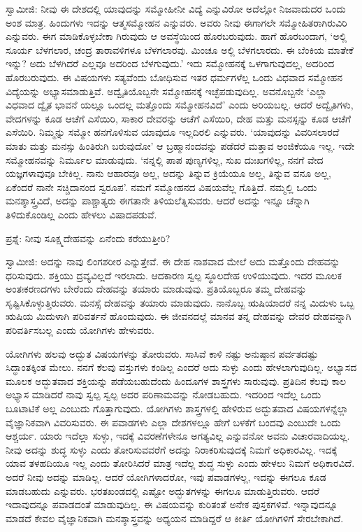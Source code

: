 ಸ್ವಾಮೀಜಿ: ನೀವು ಈ ದೇಶದಲ್ಲಿ ಯಾವುದನ್ನು ಸಮ್ಮೋಹೀನೀ ವಿದ್ಯೆ  ಎನ್ನುವಿರೋ ಅದೆಲ್ಲೋ ನಿಜವಾದುದರ ಒಂದು ಅಂಶ ಮಾತ್ರ. ಹಿಂದುಗಳು ಇದನ್ನು ಆತ್ಮಸಮ್ಮೋಹನ  ಎನ್ನುವರು. ಅವರು ನೀವು ಈಗಾಗಲೇ ಸಮ್ಮೋಹಿತರಾಗಿರುವಿರಿ ಎನ್ನುವರು. ಈಗ ಮಾಡಿಕೊಳ್ಳಬೇಕಾ ಗಿರುವುದು ಆ ಅವಸ್ಥೆಯಿಂದ ಹೊರಬರುವುದು. ಹಾಗೆ ಹೊರಬಂದಾಗ, ‘ಅಲ್ಲಿ ಸೂರ್ಯ ಬೆಳಗಲಾರ, ಚಂದ್ರ ತಾರಾವಳಿಗಳೂ ಬೆಳಗಲಾರವು. ಮಿಂಚೂ ಅಲ್ಲಿ ಬೆಳಗಲಾರದು. ಈ ಬೆಂಕಿಯ ಮಾತೇಕೆ ಇನ್ನು? ಅದು ಬೆಳಗಿದರೆ ಎಲ್ಲವೂ ಅದರಿಂದ ಬೆಳಗುವುದು.’ ಇದು ಸಮ್ಮೋಹನಕ್ಕೆ ಒಳಗಾಗುವುದಲ್ಲ, ಅದರಿಂದ ಹೊರಬರುವುದು. ಈ ವಿಷಯಗಳು ಸತ್ಯವೆಂದು ಬೋಧಿಸುವ ಇತರ ಧರ್ಮಗಳೆಲ್ಲ ಒಂದು ವಿಧವಾದ ಸಮ್ಮೋಹನ ವಿದ್ಯೆಯನ್ನು ಅಭ್ಯಾಸಮಾಡುತ್ತಿವೆ. ಅದ್ವೈತಿಯೊಬ್ಬನೇ ಸಮ್ಮೋಹನಕ್ಕೆ ಇಚ್ಛೆಪಡುವುದಿಲ್ಲ. ಅವನೊಬ್ಬನೇ ‘ಎಲ್ಲಾ ವಿಧವಾದ ದ್ವೈತ ಭಾವನೆ ಯಲ್ಲೂ ಒಂದಲ್ಲ ಮತ್ತೊಂದು ಸಮ್ಮೋಹನವಿದೆ’ ಎಂದು ಅರಿಯಬಲ್ಲ. ಆದರೆ ಅದ್ವೈತಿಗಳು, ವೇದಗಳನ್ನು ಕೂಡ ಆಚೆಗೆ ಎಸೆಯಿರಿ, ಸಾಕಾರ ದೇವರನ್ನು ಆಚೆಗೆ ಎಸೆಯಿರಿ, ದೇಹ ಮತ್ತು ಮನಸ್ಸನ್ನು ಕೂಡ ಆಚೆಗೆ ಎಸೆಯಿರಿ. ನಿಮ್ಮನ್ನು ಸಮ್ಮೋ ಹನಗೊಳಿಸುವ ಯಾವುದೂ ಇಲ್ಲದಿರಲಿ ಎನ್ನುವರು. ‘ಯಾವುದನ್ನು ವಿವರಿಸಲಾರದೆ ಮಾತು ಮತ್ತು ಮನಸ್ಸು ಹಿಂತಿರುಗಿ ಬರುವುದೋ’ ಆ ಬ್ರಹ್ಮಾನಂದವನ್ನು ಪಡೆದರೆ ಮತ್ತಾವ ಅಂಜಿಕೆಯೂ ಇಲ್ಲ. ಇದೇ ಸಮ್ಮೋಹನವನ್ನು ನಿರ್ಮೂಲ ಮಾಡುವುದು. ‘ನನ್ನಲ್ಲಿ ಪಾಪ ಪುಣ್ಯಗಳಿಲ್ಲ, ಸುಖ ದುಃಖಗಳಿಲ್ಲ, ನನಗೆ ವೇದ ಯಜ್ಞಗಳಾವುವೂ ಬೇಕಿಲ್ಲ. ನಾನು ಆಹಾರವೂ ಅಲ್ಲ, ಅದನ್ನು ತಿನ್ನುವ ಕ್ರಿಯೆಯೂ ಅಲ್ಲ, ತಿನ್ನುವ ವನೂ ಅಲ್ಲ, ಏಕೆಂದರೆ ನಾನೇ ಸಚ್ಚಿದಾನಂದ ಸ್ವರೂಪ’. ನಮಗೆ ಸಮ್ಮೋಹನದ ವಿಷಯವೆಲ್ಲ ಗೊತ್ತಿದೆ. ನಮ್ಮಲ್ಲಿ ಒಂದು ಮನಶ್ಶಾಸ್ತ್ರವಿದೆ, ಅದನ್ನು ಪಾಶ್ಚಾತ್ಯರು ಈಗತಾನೇ ತಿಳಿಯಲೆತ್ನಿಸುವರು. ಆದರೆ ಅದನ್ನು ಇನ್ನೂ ಚೆನ್ನಾಗಿ ತಿಳಿದುಕೊಂಡಿಲ್ಲ ಎಂದು ಹೇಳಲು ವಿಷಾದಪಡುವೆ.

ಪ್ರಶ್ನೆ: ನೀವು ಸೂಕ್ಷ್ಮದೇಹವನ್ನು ಏನೆಂದು ಕರೆಯುತ್ತೀರಿ?

ಸ್ವಾಮೀಜಿ: ಅದನ್ನು ನಾವು ಲಿಂಗಶರೀರ ಎನ್ನುತ್ತೇವೆ. ಈ ದೇಹ ನಾಶವಾದ ಮೇಲೆ ಅದು ಮತ್ತೊಂದು ದೇಹವನ್ನು ಧರಿಸುವುದು. ಶಕ್ತಿಯು ದ್ರವ್ಯವಿಲ್ಲದೆ ಇರಲಾದು. ಆದಕಾರಣ ಸ್ವಲ್ಪ ಸ್ಥೂಲದೇಹ ಉಳಿಯುವುದು. ಇದರ ಮೂಲಕ ಅಂತಃಕರಣದಗಳು ಬೇರೆಂದು ದೇಹವನ್ನು ತಯಾರು ಮಾಡುವುವು. ಪ್ರತಿಯೊಬ್ಬರೂ ತಮ್ಮ ದೇಹವನ್ನು ಸೃಷ್ಟಿಸಿಕೊಳ್ಳುತ್ತಿರುವರು. ಮನಸ್ಸೆ ದೇಹವನ್ನು ತಯಾರು ಮಾಡುವುದು. ನಾನೊಬ್ಬ ಋಷಿಯಾದರೆ ನನ್ನ ಮಿದುಳು ಒಬ್ಬ ಋಷಿಯ ಮಿದುಳಾಗಿ ಪರಿವರ್ತನೆ ಹೊಂದುವುದು. ಈ ಜೀವನದಲ್ಲೆ ಮಾನವ ತನ್ನ ದೇಹವನ್ನು ದೇವರ ದೇಹವನ್ನಾಗಿ ಪರಿವರ್ತಿಸಬಲ್ಲ ಎಂದು ಯೋಗಿಗಳು ಹೇಳುವರು.

ಯೋಗಿಗಳು ಹಲವು ಅದ್ಭುತ ವಿಷಯಗಳನ್ನು ತೋರುವರು. ಸಾಸಿವೆ ಕಾಳಿ ನಷ್ಟು ಅನುಷ್ಠಾನ ಪರ್ವತದಷ್ಟು ಸಿದ್ಧಾಂತಕ್ಕಿಂತ ಮೇಲು. ನನಗೆ ಕೆಲವು ವಸ್ತುಗಳು ಕಂಡಿಲ್ಲ ಎಂದರೆ ಅದು ಸುಳ್ಳು ಎಂದು ಹೇಳಲಾಗುವುದಿಲ್ಲ. ಅಭ್ಯಾಸದ ಮೂಲಕ ಅದ್ಭುತವಾದ ಶಕ್ತಿಯನ್ನು ಪಡೆಯಬಹುದೆಂದು ಹಿಂದೂಗಳ ಶಾಸ್ತ್ರಗಳು ಸಾರುವುವು. ಪ್ರತಿದಿನ ಕೆಲವು ಕಾಲ ಅಭ್ಯಾಸ ಮಾಡಿದರೆ ನಾವು ಸ್ವಲ್ಪ ಸ್ವಲ್ಪ ಅದರ ಪರಿಣಾಮವನ್ನು ನೋಡಬಹುದು. ಇದರಿಂದ ಇದೆಲ್ಲ ಒಂದು ಬೂಟಾಟಿಕೆ ಅಲ್ಲ ಎಂಬುದು ಗೊತ್ತಾಗುವುದು. ಯೋಗಿಗಳು ಶಾಸ್ತ್ರಗಳಲ್ಲಿ ಹೇಳಿರುವ ಅದ್ಭುತವಾದ ವಿಷಯಗಳನ್ನೆಲ್ಲಾ ವೈಜ್ಞಾನಿಕವಾಗಿ ವಿವರಿಸುವರು. ಈ ಪವಾಡಗಳು ಎಲ್ಲಾ ದೇಶಗಳಲ್ಲೂ ಹೇಗೆ ಬಳಕೆಗೆ ಬಂದವು ಎಂಬುದೇ ಒಂದು ಆಶ್ಚರ್ಯ. ಯಾರು ಇದೆಲ್ಲಾ ಸುಳ್ಳು, ಇದಕ್ಕೆ ವಿವರಣೆಗಳೇನೂ ಅಗತ್ಯವಿಲ್ಲ ಎನ್ನುವನೋ ಅವನು ವಿಚಾರವಾದಿಯಲ್ಲ. ನೀವು ಅದನ್ನು ಶುದ್ಧ ಸುಳ್ಳು ಎಂದು ತೋರಿಸುವವರೆಗೆ ಅದನ್ನು ನಿರಾಕರಿಸುವುದಕ್ಕೆ ನಿಮಗೆ ಅಧಿಕಾರವಿಲ್ಲ. ಇದಕ್ಕೆ ಯಾವ ತಳಹದಿಯೂ ಇಲ್ಲ ಎಂದು ತೋರಿಸಿದರೆ ಮಾತ್ರ ಇದೆಲ್ಲ ಶುದ್ಧ ಸುಳ್ಳು ಎಂದು ಹೇಳಲು ನಿಮಗೆ ಅಧಿಕಾರವಿದೆ. ಅದರೆ ನೀವು ಅದನ್ನು ಮಾಡಿಲ್ಲ. ಆದರೆ ಯೋಗಿಗಳಾದರೋ, ಇವು ಪವಾಡಗಳಲ್ಲ, ಇದನ್ನು ಈಗಲೂ ಕೂಡ ಮಾಡಬಹುದು ಎನ್ನುವರು. ಭರತಖಂಡದಲ್ಲಿ ಎಷ್ಟೋ ಅದ್ಭುತಗಳನ್ನು ಈಗಲೂ ಮಾಡುತ್ತಿರುವರು. ಆದರೆ ಇದಾವುದನ್ನೂ ಪವಾಡದಂತೆ ಮಾಡುವುದಿಲ್ಲ. ಈ ವಿಷಯವನ್ನು ಕುರಿತಂತೆ ಅನೇಕ ಪುಸ್ತಕಗಳಿವೆ. ಇನ್ನಾವುದನ್ನೂ ಮಾಡದೆ ಕೇವಲ ವೈಜ್ಞಾನಿಕವಾಗಿ ಮನಶ್ಶಾಸ್ತ್ರವನ್ನು ಅಧ್ಯಯನ ಮಾಡಿದ್ದರೆ ಆ ಕೀರ್ತಿ ಯೋಗಿಗಳಿಗೆ ಸೇರಬೇಕಾಗಿದೆ.

